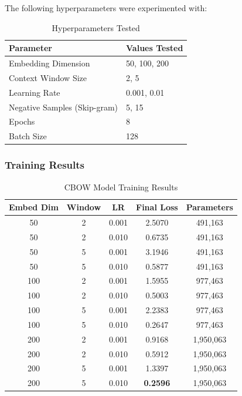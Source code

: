 \documentclass[12pt,a4paper]{article}
\begin{document}
The following hyperparameters were experimented with:

\begin{table}[H]
\centering
\caption{Hyperparameters Tested}
\begin{tabular}{@{}ll@{}}
\toprule
\textbf{Parameter} & \textbf{Values Tested} \\
\midrule
Embedding Dimension & 50, 100, 200 \\
Context Window Size & 2, 5 \\
Learning Rate & 0.001, 0.01 \\
Negative Samples (Skip-gram) & 5, 15 \\
Epochs & 8 \\
Batch Size & 128 \\
\bottomrule
\end{tabular}
\end{table}

\subsubsection{Training Results}

\begin{table}[H]
\centering
\caption{CBOW Model Training Results}
\begin{tabular}{@{}ccccc@{}}
\toprule
\textbf{Embed Dim} & \textbf{Window} & \textbf{LR} & \textbf{Final Loss} & \textbf{Parameters} \\
\midrule
50 & 2 & 0.001 & 2.5070 & 491,163 \\
50 & 2 & 0.010 & 0.6735 & 491,163 \\
50 & 5 & 0.001 & 3.1946 & 491,163 \\
50 & 5 & 0.010 & 0.5877 & 491,163 \\
100 & 2 & 0.001 & 1.5955 & 977,463 \\
100 & 2 & 0.010 & 0.5003 & 977,463 \\
100 & 5 & 0.001 & 2.2383 & 977,463 \\
100 & 5 & 0.010 & 0.2647 & 977,463 \\
200 & 2 & 0.001 & 0.9168 & 1,950,063 \\
200 & 2 & 0.010 & 0.5912 & 1,950,063 \\
200 & 5 & 0.001 & 1.3397 & 1,950,063 \\
200 & 5 & 0.010 & \textbf{0.2596} & 1,950,063 \\
\bottomrule
\end{tabular}
\end{table}
\end{document}
